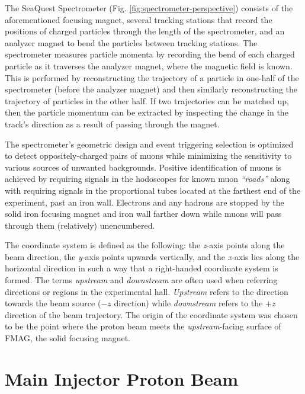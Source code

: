 The SeaQuest Spectrometer (Fig. \ref{fig:spectrometer-perspective}) consists of the aforementioned focusing magnet, several tracking stations that record the positions of charged particles through the length of the spectrometer, and an analyzer magnet to bend the particles between tracking stations. The spectrometer measures particle momenta by recording the bend of each charged particle as it traverses the analyzer magnet, where the magnetic field is known. This is performed by reconstructing the trajectory of a particle in one-half of the spectrometer (before the analyzer magnet) and then similarly reconstructing the trajectory of particles in the other half. If two trajectories can be matched up, then the particle momentum can be extracted by inspecting the change in the track's direction as a result of passing through the magnet.

The spectrometer's geometric design and event triggering selection is optimized to detect oppositely-charged pairs of muons while minimizing the sensitivity to various sources of unwanted backgrounds. Positive identification of muons is achieved by requiring signals in the hodoscopes for known muon \emph{``roads''} along with requiring signals in the proportional tubes located at the farthest end of the experiment, past an iron wall. Electrons and any hadrons are stopped by the solid iron focusing magnet and iron wall farther down while muons will pass through them (relatively) unencumbered.

The coordinate system is defined as the following: the \emph{z}-axis points along the beam direction, the \emph{y}-axis points upwards vertically, and the \emph{x}-axis lies along the horizontal direction in such a way that a right-handed coordinate system is formed. The terms \emph{upstream} and \emph{downstream} are often used when referring directions or regions in the experimental hall. \emph{Upstream} refers to the direction towards the beam source ($-z$ direction) while \emph{downstream} refers to the $+z$ direction of the beam trajectory. The origin of the coordinate system was chosen to be the point where the proton beam meets the \emph{upstream}-facing surface of FMAG, the solid focusing magnet.

\section{Main Injector Proton Beam}

